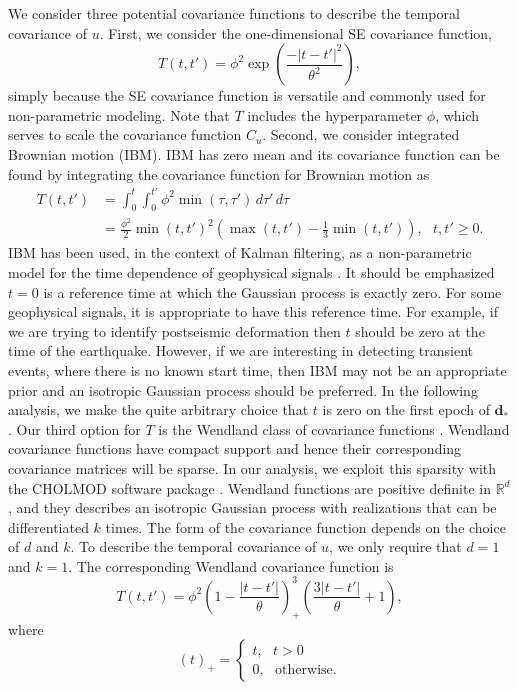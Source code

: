 \documentclass[10pt,a4paper]{article}
\begin{document}
We consider three potential covariance functions to describe the temporal covariance of $u$.  First, we consider the one-dimensional SE covariance function, 
\begin{equation}\label{eq:TimeSE}
T(t,t') = \phi^2\exp\left(\frac{-|t - t'|^2}{\theta^2}\right),
\end{equation}
simply because the SE covariance function is versatile and commonly used for non-parametric modeling. Note that $T$ includes the hyperparameter $\phi$, which serves to scale the covariance function $C_u$. Second, we consider integrated Brownian motion (IBM). IBM has zero mean and its covariance function can be found by integrating the covariance function for Brownian motion as
\begin{align}\label{eq:IBM}
T(t,t') &= \int_0^t \int_0^{t'} \phi^2 \min(\tau,\tau') \,d\tau'\,d\tau \\
        &= \frac{\phi^2}{2}\min(t,t')^2 \left(\max(t,t') - \frac{1}{3}\min(t,t')\right), \ \ \ t,t' \geq 0.
\end{align}
IBM has been used, in the context of Kalman filtering, as a non-parametric model for the time dependence of geophysical signals \citep[e.g.,][]{Segall1997,McGuire2003,Ohtani2010,Hines2016}. It should be emphasized $t=0$ is a reference time at which the Gaussian process is exactly zero.  For some geophysical signals, it is appropriate to have this reference time. For example, if we are trying to identify postseismic deformation then $t$ should be zero at the time of the earthquake.  However, if we are interesting in detecting transient events, where there is no known start time, then IBM may not be an appropriate prior and an isotropic Gaussian process should be preferred. In the following analysis, we make the quite arbitrary choice that $t$ is zero on the first epoch of $\bm{d}_*$.  Our third option for $T$ is the Wendland class of covariance functions \citep{Wendland2005}. Wendland covariance functions have compact support and hence their corresponding covariance matrices will be sparse. In our analysis, we exploit this sparsity with the CHOLMOD software package \citep{Chen2008}.  Wendland functions are positive definite in $\mathbb{R}^d$, and they describes an isotropic Gaussian process with realizations that can be differentiated $k$ times. The form of the covariance function depends on the choice of $d$ and $k$. To describe the temporal covariance of $u$, we only require that $d=1$ and $k=1$. The corresponding Wendland covariance function is 
\begin{equation}\label{eq:Wendland}
T(t,t') = \phi^2\left(1 - \frac{|t - t'|}{\theta}\right)^3_+ \left(\frac{3|t - t'|}{\theta} + 1\right), 
\end{equation}
where
\begin{equation}
(t)_+ = 
\begin{cases}
t, \ \ \ t > 0 \\
0, \ \ \ \mathrm{otherwise}.
\end{cases}
\end{equation}
\end{document}
